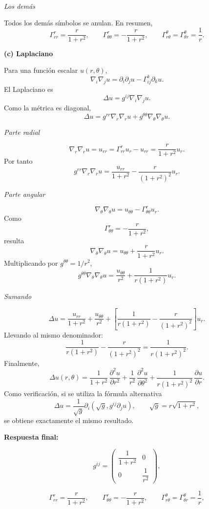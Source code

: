 \documentclass[12pt]{article}
\begin{document}
{\em Los demás}

Todos los demás símbolos se anulan.
En resumen,
$$
\boxed{
\Gamma^r_{rr}=\frac{r}{1+r^2},
\qquad
\Gamma^r_{\theta\theta}
=
-\frac{r}{1+r^2},
\qquad
\Gamma^\theta_{r\theta}
=
\Gamma^\theta_{\theta r}
=
\frac1r.
}
$$

{\bf (c) Laplaciano}

Para una función escalar $u(r,\theta)$,
$$
\nabla_i\nabla_j u
=
\partial_i\partial_j u
-
\Gamma^k_{ij}\partial_k u.
$$
El Laplaciano es
$$
\Delta u
=
g^{ij}\nabla_i\nabla_j u.
$$
Como la métrica es diagonal,
$$
\Delta u
=
g^{rr}\nabla_r\nabla_r u
+
g^{\theta\theta}\nabla_\theta\nabla_\theta u.
$$

{\em Parte radial}

$$
\nabla_r\nabla_r u
=
u_{rr}
=
\Gamma^r_{rr}u_r
-
u_{rr}
=
\frac{r}{1+r^2}u_r.
$$
Por tanto
$$
g^{rr}\nabla_r\nabla_r u
=
\frac{u_{rr}}{1+r^2}
-
\frac{r}{(1+r^2)^2}u_r.
$$

{\em Parte angular}

$$
\nabla_\theta\nabla_\theta u
=
u_{\theta\theta}
-
\Gamma^r_{\theta\theta}u_r.
$$
Como
$$
\Gamma^r_{\theta\theta}
=
-\frac{r}{1+r^2},
$$
resulta
$$
\nabla_\theta\nabla_\theta u
=
u_{\theta\theta}
+
\frac{r}{1+r^2}u_r.
$$
Multiplicando por $g^{\theta\theta}=1/r^2$,
$$
g^{\theta\theta}\nabla_\theta\nabla_\theta u
=
\frac{u_{\theta\theta}}{r^2}
+
\frac1{r(1+r^2)}u_r.
$$

{\em Sumando}

$$
\Delta u
=
\frac{u_{rr}}{1+r^2}
+
\frac{u_{\theta\theta}}{r^2}
+
\left[
\frac1{r(1+r^2)}
-
\frac{r}{(1+r^2)^2}
\right]u_r.
$$
Llevando al mismo denominador:
$$
\frac1{r(1+r^2)}
-
\frac{r}{(1+r^2)^2}
=
\frac1{r(1+r^2)^2}.
$$
Finalmente,
$$
\boxed{
\Delta u(r,\theta)
=
\frac1{1+r^2}\,
\frac{\partial^2u}{\partial r^2}
+
\frac1{r^2}\,
\frac{\partial^2u}{\partial\theta^2}
+
\frac1{r(1+r^2)^2}\,
\frac{\partial u}{\partial r}
}.
$$
Como verificación, si se utiliza la fórmula alternativa
$$
\Delta u
=
\frac1{\sqrt g}
\partial_i
\left(
\sqrt g,g^{ij}\partial_j u
\right),
\qquad
\sqrt g=r\sqrt{1+r^2},
$$
se obtiene exactamente el mismo resultado.

{\bf Respuesta final:}

$$
g^{ij}
=
\begin{pmatrix}
\dfrac1{1+r^2} & 0\\
0 & \dfrac1{r^2}
\end{pmatrix},
$$

$$
\Gamma^r_{rr}=\frac{r}{1+r^2},
\qquad
\Gamma^r_{\theta\theta}=-\frac{r}{1+r^2},
\qquad
\Gamma^\theta_{r\theta}
=
\Gamma^\theta_{\theta r}
=
\frac1r,
$$
\end{document}
